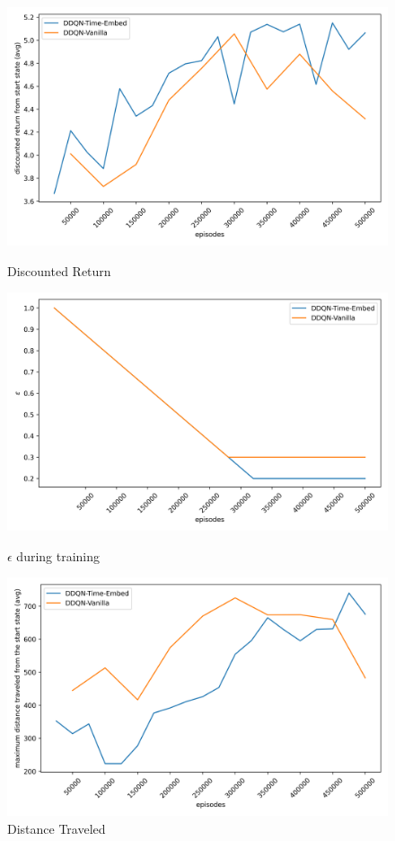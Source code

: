 \begin{figure}[H]
    \centering
    \begin{minipage}{0.32\linewidth}
        \centering
        \includegraphics[width=\linewidth]{plots/part3-ddqn-rewards.png}
        \caption{Discounted Return}
    \end{minipage}
    \hfill
    \begin{minipage}{0.32\linewidth}
        \centering
        \includegraphics[width=\linewidth]{plots/part3-ddqn-epsilons.png}
        \caption{$\epsilon$ during training}
    \end{minipage}
    \hfill
    \begin{minipage}{0.32\linewidth}
        \centering
        \includegraphics[width=\linewidth]{plots/part3-ddqn-distances.png}
        \caption{Distance Traveled}
    \end{minipage}


\end{figure}
